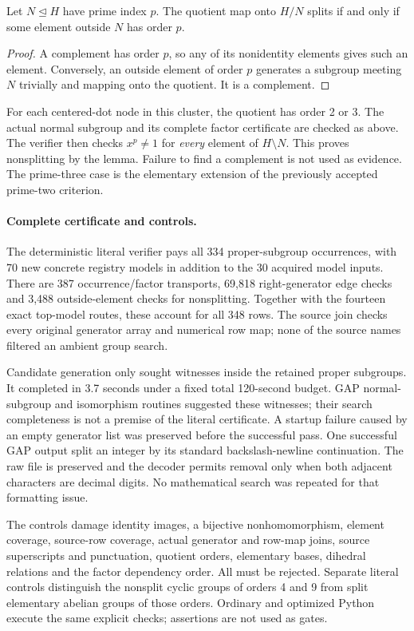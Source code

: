 \documentclass[11pt]{article}
\begin{document}
\begin{lemma}
Let $N\trianglelefteq H$ have prime index $p$. The quotient map onto $H/N$
splits if and only if some element outside $N$ has order $p$.
\end{lemma}
\begin{proof}
A complement has order $p$, so any of its nonidentity elements gives such an
element. Conversely, an outside element of order $p$ generates a subgroup
meeting $N$ trivially and mapping onto the quotient. It is a complement.
\end{proof}
For each centered-dot node in this cluster, the quotient has order 2 or 3.
The actual normal subgroup and its complete factor certificate are checked
as above. The verifier then checks $x^p\ne1$ for \emph{every} element of
$H\setminus N$. This proves nonsplitting by the lemma. Failure to find a
complement is not used as evidence. The prime-three case is the elementary
extension of the previously accepted prime-two criterion.

\newpage
\paragraph{Complete certificate and controls.}
The deterministic literal verifier pays all 334 proper-subgroup occurrences,
with 70 new concrete registry models in addition to the 30 acquired model
inputs. There are 387 occurrence/factor transports, 69,818 right-generator
edge checks and 3,488 outside-element checks for nonsplitting. Together with
the fourteen exact top-model routes, these account for all 348 rows. The
source join checks every original generator array and numerical row map;
none of the source names filtered an ambient group search.

Candidate generation only sought witnesses inside the retained proper
subgroups. It completed in 3.7 seconds under a fixed total 120-second budget.
GAP normal-subgroup and isomorphism routines suggested these witnesses;
their search completeness is not a premise of the literal certificate. A
startup failure caused by an empty generator list was preserved before the
successful pass. One successful GAP output split an integer by its standard
backslash-newline continuation. The raw file is preserved and the decoder
permits removal only when both adjacent characters are decimal digits.
No mathematical search was repeated for that formatting issue.

The controls damage identity images, a bijective nonhomomorphism, element
coverage, source-row coverage, actual generator and row-map joins, source
superscripts and punctuation, quotient orders, elementary bases, dihedral
relations and the factor dependency order. All must be rejected. Separate
literal controls distinguish the nonsplit cyclic groups of orders 4 and 9
from split elementary abelian groups of those orders. Ordinary and optimized
Python execute the same explicit checks; assertions are not used as gates.
\end{document}
